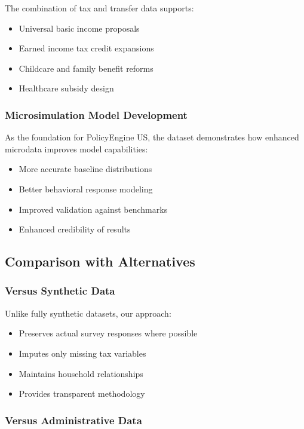 The combination of tax and transfer data supports:
\begin{itemize}
\item Universal basic income proposals
\item Earned income tax credit expansions
\item Childcare and family benefit reforms
\item Healthcare subsidy design
\end{itemize}

\subsubsection{Microsimulation Model Development}

As the foundation for PolicyEngine US, the dataset demonstrates how enhanced microdata improves model capabilities:
\begin{itemize}
\item More accurate baseline distributions
\item Better behavioral response modeling
\item Improved validation against benchmarks
\item Enhanced credibility of results
\end{itemize}

\subsection{Comparison with Alternatives}

\subsubsection{Versus Synthetic Data}

Unlike fully synthetic datasets, our approach:
\begin{itemize}
\item Preserves actual survey responses where possible
\item Imputes only missing tax variables
\item Maintains household relationships
\item Provides transparent methodology
\end{itemize}

\subsubsection{Versus Administrative Data}

